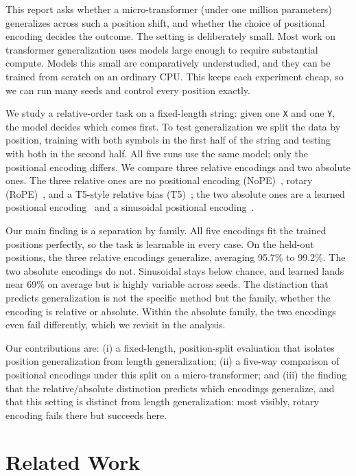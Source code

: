 \documentclass{article}
\begin{document}
This report asks whether a micro-transformer (under one million parameters)
generalizes across such a position shift, and whether the choice of positional
encoding decides the outcome. The setting is deliberately small. Most work on
transformer generalization uses models large enough to require substantial
compute. Models this small are comparatively understudied, and they can be trained
from scratch on an ordinary CPU. This keeps each experiment cheap, so we can run
many seeds and control every position exactly.

We study a relative-order task on a fixed-length string: given one \texttt{X} and
one \texttt{Y}, the model decides which comes first. To test generalization we
split the data by position, training with both symbols in the first half of the
string and testing with both in the second half. All five runs use the same
model; only the positional encoding differs. We compare three relative encodings
and two absolute ones. The three relative ones are no positional encoding
(NoPE)~\citep{kazemnejad2023impact}, rotary (RoPE)~\citep{su2021roformer}, and a
T5-style relative bias (T5)~\citep{raffel2020t5}; the two absolute ones are a
learned positional encoding~\citep{radford2018improving} and a sinusoidal
positional encoding~\citep{vaswani2017attention}.

Our main finding is a separation by family. All five encodings fit the trained
positions perfectly, so the task is learnable in every case. On the held-out
positions, the three relative encodings generalize, averaging 95.7\% to 99.2\%.
The two absolute encodings do not. Sinusoidal stays below chance, and learned
lands near 69\% on average but is highly variable across seeds. The
distinction that predicts generalization is not the specific method but the family,
whether the encoding is relative or absolute. Within the absolute family, the two
encodings even fail differently, which we revisit in the analysis.

Our contributions are: (i) a fixed-length, position-split evaluation that
isolates position generalization from length generalization; (ii) a five-way
comparison of positional encodings under this split on a micro-transformer; and
(iii) the finding that the relative/absolute distinction predicts which encodings
generalize, and that this setting is distinct from length generalization: most
visibly, rotary encoding fails there but succeeds here.

\section{Related Work}
\end{document}
